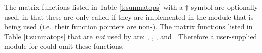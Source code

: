 The matrix functions listed in Table \ref{t:sunmatops} with
a $\dagger$ symbol are optionally used, in that these are only called
if they are implemented in the {\sunmatrix} module that is being used
(i.e.~their function pointers are non-).  The matrix
functions listed in Table \ref{t:sunmatops} that are {\em not} used by 
{\ida} are: , , ,
 and . Therefore a user-supplied
{\sunmatrix} module for {\ida} could omit these functions.





